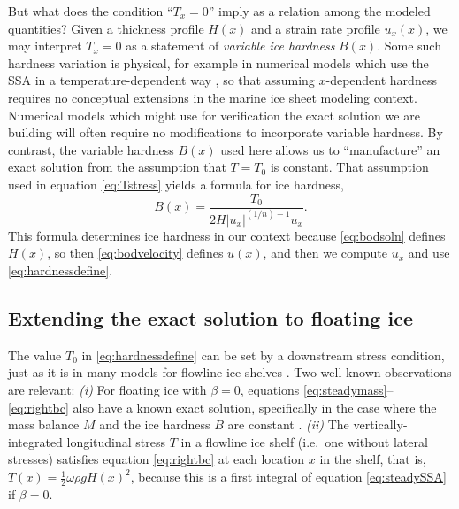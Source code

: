 \documentclass[review,letterpaper]{igs}
\begin{document}
But what does the condition ``$T_x = 0$'' imply as a relation among the modeled quantities?  Given a thickness profile $H(x)$ and a strain rate profile $u_x(x)$, we may interpret $T_x = 0$ as a statement of \emph{variable ice hardness} $B(x)$.  Some such hardness variation is physical, for example in numerical models which use the SSA in a temperature-dependent way \citep{BBssasliding}, so that assuming $x$-dependent hardness requires no conceptual extensions in the marine ice sheet modeling context.  Numerical models which might use for verification the exact solution we are building will often require no modifications to incorporate variable hardness.  By contrast, the variable hardness $B(x)$ used here allows us to ``manufacture'' an exact solution \citep{BLKCB} from the assumption that $T=T_0$ is constant.  That assumption used in equation \eqref{eq:Tstress} yields a formula for ice hardness,
\begin{equation}
B(x) = \frac{T_0}{2 H |u_x|^{(1/n)-1} u_x}. \label{eq:hardnessdefine}
\end{equation}
This formula determines ice hardness in our context because \eqref{eq:bodsoln} defines $H(x)$, so then \eqref{eq:bodvelocity} defines $u(x)$, and then we compute $u_x$ and use \eqref{eq:hardnessdefine}.


\subsection*{Extending the exact solution to floating ice}  The value $T_0$ in \eqref{eq:hardnessdefine} can be set by a downstream stress condition, just as it is in many models for flowline ice shelves \citep[e.g.][]{MISMIP2012,SchoofMarine1}.  Two well-known observations are relevant:  \emph{(i)}  For floating ice with $\beta=0$, equations \eqref{eq:steadymass}--\eqref{eq:rightbc} also have a known exact solution, specifically in the case where the mass balance $M$ and the ice hardness $B$ are constant \citep{vanderVeen83,vanderVeen}.  \emph{(ii)}  The vertically-integrated longitudinal stress $T$ in a flowline ice shelf (i.e.~one without lateral stresses) satisfies equation \eqref{eq:rightbc} at each location $x$ in the shelf, that is, $T(x) = \frac{1}{2} \omega \rho g H(x)^2$, because this is a first integral of equation \eqref{eq:steadySSA} if $\beta=0$.
\end{document}
